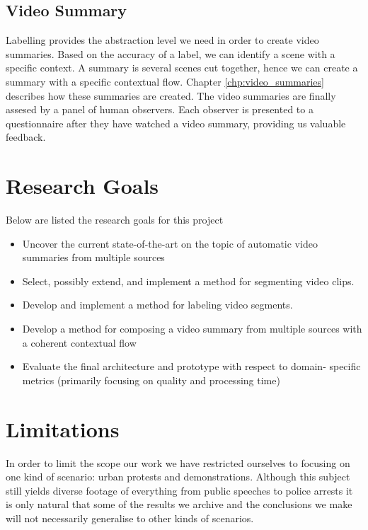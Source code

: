 \subsection{Video Summary}
%
Labelling provides the abstraction level we need in order to create video summaries. Based on the accuracy of a label, we can identify a scene with a specific context. A summary is several scenes cut together, hence we can create a summary with a specific contextual flow. Chapter \ref{chp:video_summaries} describes how these summaries are created. The video summaries are finally assesed by a panel of human observers. Each observer is presented to a questionnaire after they have watched a video summary, providing us valuable feedback.
%
\section{Research Goals}
%
Below are listed the research goals for this project
%
\begin{itemize}
\item Uncover the current state-of-the-art on the topic of automatic video summaries from multiple sources
\item Select, possibly extend, and implement a method for segmenting video clips.
\item Develop and implement a method for labeling video segments.
\item Develop a method for composing a video summary from multiple sources with a coherent contextual flow
\item Evaluate the final architecture and prototype with respect to domain- specific metrics (primarily focusing on quality and processing time)
\end{itemize}
%
\section{Limitations}
%
%
%
%
%
In order to limit the scope our work we have restricted ourselves to focusing on one kind of scenario: urban protests and demonstrations. Although this subject still yields diverse footage of everything from public speeches to police arrests it is only natural that some of the results we archive and the conclusions we make will not necessarily generalise to other kinds of scenarios.
%

